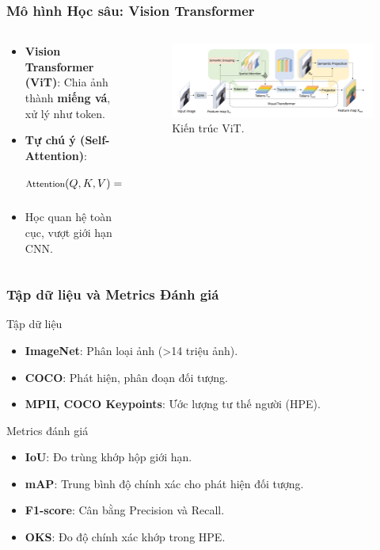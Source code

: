 \begin{frame}
\frametitle{Mô hình Học sâu: Vision Transformer}
\begin{columns}
\begin{column}{0.5\textwidth}
\begin{itemize}
\item \textbf{Vision Transformer (ViT)}: Chia ảnh thành \textbf{miếng vá}, xử lý như token.
\item \textbf{Tự chú ý (Self-Attention)}:
\begin{equation}
\footnotesize
\text{Attention}(Q, K, V) = \text{softmax}\left(\frac{QK^T}{\sqrt{d_k}}\right)V
\end{equation}
\item Học quan hệ toàn cục, vượt giới hạn CNN.
\end{itemize}
\end{column}

\begin{column}{0.45\textwidth}
\begin{figure}
\centering
\includegraphics[width=\textwidth]{images/visual_transformer.png}
\caption{Kiến trúc ViT.}
\label{fig:vit_arch}
\end{figure}
\end{column}
\end{columns}
\end{frame}
\begin{frame}
\frametitle{Tập dữ liệu và Metrics Đánh giá}
\begin{block}{Tập dữ liệu}
\begin{itemize}
\item \textbf{ImageNet}: Phân loại ảnh (>14 triệu ảnh).
\item \textbf{COCO}: Phát hiện, phân đoạn đối tượng.
\item \textbf{MPII, COCO Keypoints}: Ước lượng tư thế người (HPE).
\end{itemize}
\end{block}

\begin{block}{Metrics đánh giá}
\begin{itemize}
\item \textbf{IoU}: Đo trùng khớp hộp giới hạn.
\item \textbf{mAP}: Trung bình độ chính xác cho phát hiện đối tượng.
\item \textbf{F1-score}: Cân bằng Precision và Recall.
\item \textbf{OKS}: Đo độ chính xác khớp trong HPE.
\end{itemize}
\end{block}
\end{frame}
